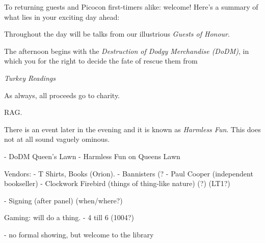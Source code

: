 To returning guests and Picocon first-timers alike: welcome! Here's a
summary of what lies in your exciting day ahead:

Throughout the day will be talks from our illustrious \emph{Guests of Honour}.

The afternoon begins with the \emph{Destruction of Dodgy Merchandise
(DoDM)}, in which you
for the right to decide the fate of rescue them from

\emph{Turkey Readings}

As always, all proceeds go to charity.

RAG.

There is an event later in the evening and it is known
as \emph{Harmless Fun}. This does not at all sound vaguely ominous.

- DoDM Queen's Lawn
- Harmless Fun on Queens Lawn


Vendors:
- T Shirts, Books (Orion).
- Bannisters (?
- Paul Cooper (independent bookseller)
- Clockwork Firebird (things of thing-like nature) (?)
(LT1?)

- Signing (after panel) (when/where?)

Gaming: will do a thing.
- 4 till 6 (1004?)

- no formal showing, but welcome to the library

